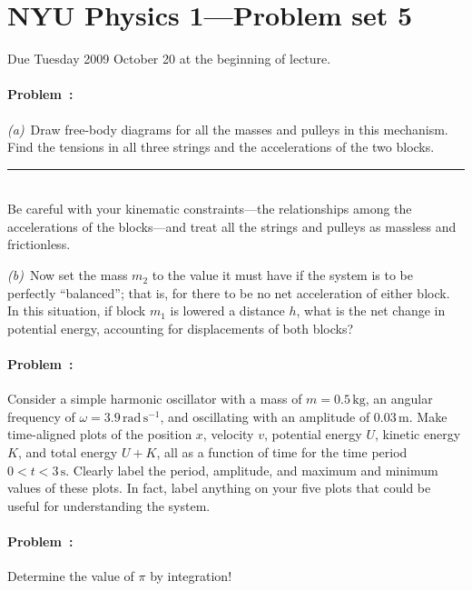 \documentclass[12pt]{article}
\newcommand{\m}{\mathrm{m}}
\newcommand{\kg}{\mathrm{kg}}
\newcommand{\rad}{\mathrm{rad}}
\newcommand{\s}{\mathrm{s}}
\newcounter{problem}
\begin{document}
\thispagestyle{empty}

\section*{NYU Physics 1---Problem set 5}

Due Tuesday 2009 October 20 at the beginning of lecture.

\paragraph{Problem~\theproblem:}%
\textsl{(a)}~Draw free-body diagrams for all the masses and pulleys in
this mechanism.  Find the tensions in all three strings and the
accelerations of the two blocks.
\\ \rule{0.35\textwidth}{0pt}
\\
Be careful with your kinematic constraints---the relationships among
the accelerations of the blocks---and treat all the strings and
pulleys as massless and frictionless.

\textsl{(b)}~Now set the mass $m_2$ to the value it must have if the
system is to be perfectly ``balanced''; that is, for there to be no
net acceleration of either block.  In this situation, if block $m_1$
is lowered a distance $h$, what is the net change in potential energy,
accounting for displacements of both blocks?

\paragraph{Problem~\theproblem:}%
Consider a simple harmonic oscillator with a mass of $m=0.5\,\kg$, an
angular frequency of $\omega=3.9\,\rad\,\s^{-1}$, and oscillating with
an amplitude of $0.03\,\m$.  Make time-aligned plots of the position
$x$, velocity $v$, potential energy $U$, kinetic energy $K$, and total
energy $U+K$, all as a function of time for the time period
$0<t<3\,\s$.  Clearly label the period, amplitude, and maximum and
minimum values of these plots.  In fact, label anything on your five
plots that could be useful for understanding the system.

\paragraph{Problem~\theproblem:}%
Determine the value of $\pi$ by integration!
\end{document}
